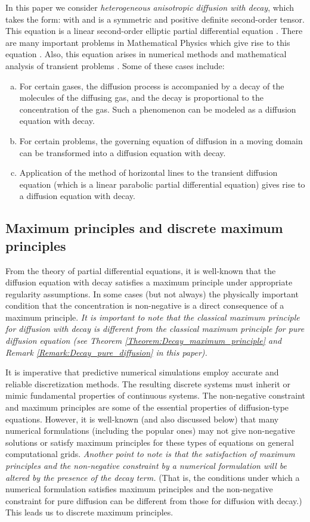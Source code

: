 \documentclass[11pt]{amsart}
\begin{document}
In this paper we consider \emph{heterogeneous anisotropic diffusion with decay}, which 
takes the form:  with  and 
 is a symmetric and positive definite second-order tensor. 
This equation is a linear second-order elliptic partial differential equation 
\cite{Gilbarg_Trudinger}. There are many important problems in Mathematical Physics 
which give rise to this equation \cite{Tikhonov_Samarskii}. Also, this equation 
arises in numerical methods and mathematical analysis of transient problems 
\cite{Ladyzhenskaya_Mathematical_Physics}. Some of these cases include:
\begin{enumerate}[(a)]
\item For certain gases, the diffusion process is accompanied by a decay of the molecules 
  of the diffusing gas, and the decay is proportional to the concentration of the gas. 
  Such a phenomenon can be modeled as a diffusion equation with decay. 
\item For certain problems, the governing equation of diffusion in a moving domain can be 
  transformed into a diffusion equation with decay. 
\item Application of the method of horizontal lines to the transient diffusion equation 
  (which is a linear parabolic partial differential equation) gives rise to a diffusion 
  equation with decay. 
\end{enumerate}

\subsection{Maximum principles and discrete maximum principles}
From the theory of partial differential equations, it is well-known that the diffusion equation 
with decay satisfies a maximum principle under appropriate regularity assumptions. In some 
cases (but not always) the physically important condition that the concentration is non-negative 
is a direct consequence of a maximum principle. \emph{It is important to note that the classical 
maximum principle for diffusion with decay is different from the classical maximum principle for 
pure diffusion equation (see Theorem \ref{Theorem:Decay_maximum_principle} and Remark 
\ref{Remark:Decay_pure_diffusion} in this paper).} 

It is imperative that predictive numerical simulations employ accurate and reliable 
discretization methods. The resulting discrete systems must inherit or mimic fundamental 
properties of continuous systems. The non-negative constraint and maximum principles are 
some of the essential properties of diffusion-type equations. However, it is well-known (and 
also discussed below) that many numerical formulations (including the popular ones) may 
not give non-negative solutions or satisfy maximum principles for these types of equations 
on general computational grids. \emph{Another point to note is that the satisfaction of 
maximum principles and the non-negative constraint by a numerical formulation will be altered 
by the presence of the decay term.} (That is, the conditions under which a numerical 
formulation satisfies maximum principles and the non-negative constraint for pure diffusion 
can be different from those for diffusion with decay.) This leads us to discrete maximum 
principles.
\end{document}
